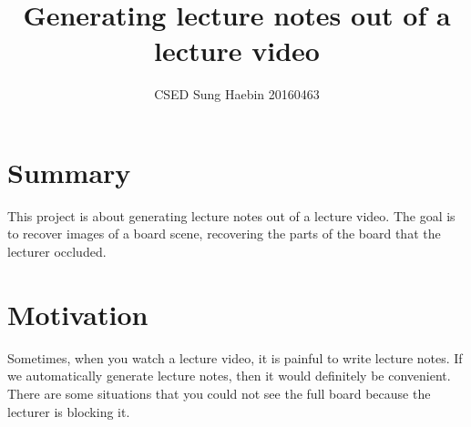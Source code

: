 \documentclass[a4paper]{article}
\title{Generating lecture notes out of a lecture video}
\author{CSED Sung Haebin 20160463}
\begin{document}
\maketitle
\section{Summary}
This project is about generating lecture notes out of a lecture video.
The goal is to recover images of a board scene, recovering the parts of the board that the lecturer occluded.

\section{Motivation}
Sometimes, when you watch a lecture video, it is painful to write lecture notes. 
If we automatically generate lecture notes, then it would definitely be convenient.
There are some situations that you could not see the full board because the lecturer is blocking it.
\begin{figure}[H]
\centering
{}
\end{figure}
\begin{figure}[H]
\centering
{}
\end{figure}
\end{document}
